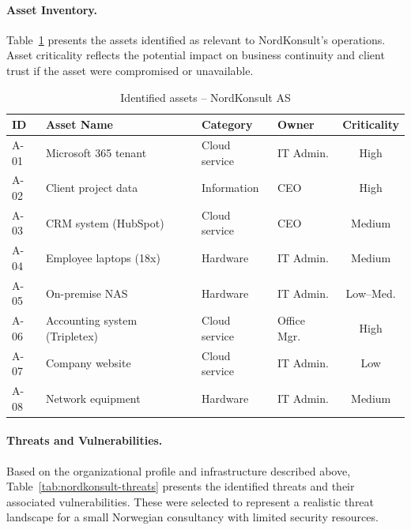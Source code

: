 \paragraph{Asset Inventory.}
Table~\ref{tab:nordkonsult-assets} presents the assets identified as relevant to NordKonsult's operations. Asset criticality reflects the potential impact on business continuity and client trust if the asset were compromised or unavailable.
 
\begin{table}[ht]
\centering
\caption{Identified assets -- NordKonsult AS}
\label{tab:nordkonsult-assets}
\begin{tabular}{llllc}
\hline
\textbf{ID} & \textbf{Asset Name} & \textbf{Category} & \textbf{Owner} & \textbf{Criticality} \\
\hline
A-01 & Microsoft 365 tenant          & Cloud service & IT Admin.       & High \\
A-02 & Client project data           & Information   & CEO             & High \\
A-03 & CRM system (HubSpot)          & Cloud service & CEO             & Medium \\
A-04 & Employee laptops (18x)        & Hardware      & IT Admin.       & Medium \\
A-05 & On-premise NAS                & Hardware      & IT Admin.       & Low--Med. \\
A-06 & Accounting system (Tripletex) & Cloud service & Office Mgr.     & High \\
A-07 & Company website               & Cloud service & IT Admin.       & Low \\
A-08 & Network equipment             & Hardware      & IT Admin.       & Medium \\
\hline
\end{tabular}
\end{table}
 
\paragraph{Threats and Vulnerabilities.}
Based on the organizational profile and infrastructure described above, Table~\ref{tab:nordkonsult-threats} presents the identified threats and their associated vulnerabilities. These were selected to represent a realistic threat landscape for a small Norwegian consultancy with limited security resources.
 
